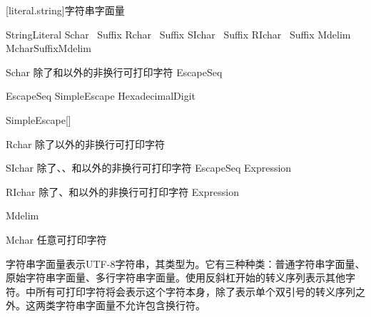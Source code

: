 [literal.string]{字符串字面量}

\begin{bnf}{StringLiteral}
     Schar\bnfs\  Suffix\bnfq \br
     Rchar\bnfs\  Suffix\bnfq \br
     SIchar\bnfs\  Suffix\bnfq \br
     RIchar\bnfs\  Suffix\bnfq \br
    Mdelim Mchar\bnfs Suffix\bnfq Mdelim
\end{bnf}

\begin{bnf}{Schar}
    \textnormal{除了\terminal{\textbackslash}和以外的非换行可打印字符} \br
    EscapeSeq
\end{bnf}

\begin{bnf}{EscapeSeq}
    \terminal{\textbackslash} SimpleEscape \br
     HexadecimalDigit\bnfp \terminal{\}}
\end{bnf}

\begin{bnf}{SimpleEscape}[\oneof]
\end{bnf}

\begin{bnf}{Rchar}
    \textnormal{除了以外的非换行可打印字符} \br
\end{bnf}

\begin{bnf}{SIchar}
    \textnormal{除了\terminal{\textbackslash}、、\terminal{\{}和\terminal{\}}以外的非换行可打印字符} \br
    EscapeSeq \br
    \terminal{\{} Expression \terminal{\}} \br
    \terminal{\{\{} \br
    \terminal{\}\}}
\end{bnf}

\begin{bnf}{RIchar}
    \textnormal{除了、\terminal{\{}和\terminal{\}}以外的非换行可打印字符} \br
     \br
    \terminal{\{} Expression \terminal{\}} \br
    \terminal{\{\{} \br
    \terminal{\}\}}
\end{bnf}

\begin{bnf}{Mdelim}
     \bnfs
\end{bnf}

\begin{bnf}{Mchar}
    \textnormal{任意可打印字符}
\end{bnf}

\pnum
字符串字面量表示UTF-8字符串，其类型为。它有三种种类：普通字符串字面量、原始字符串字面量、多行字符串字面量。使用反斜杠开始的转义序列表示其他字符。中所有可打印字符将会表示这个字符本身，除了表示单个双引号的转义序列之外。这两类字符串字面量不允许包含换行符。

